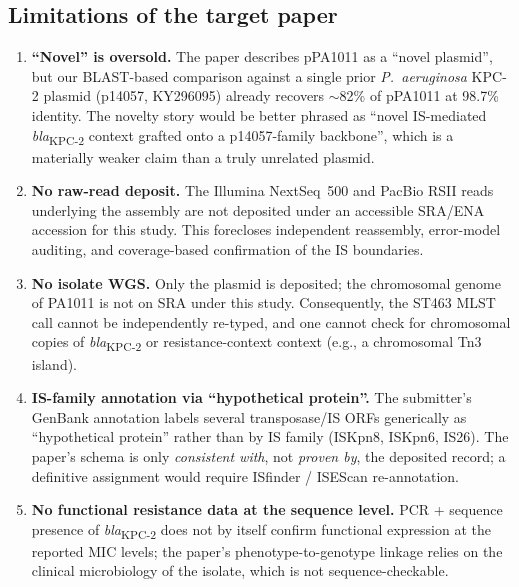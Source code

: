 \documentclass[11pt]{article}
\begin{document}
\subsection{Limitations of the target paper}
\begin{enumerate}[leftmargin=1.4em]
  \item \textbf{``Novel'' is oversold.} The paper describes pPA1011 as a ``novel plasmid'', but our BLAST-based comparison against a single prior \textit{P.~aeruginosa} KPC-2 plasmid (p14057, KY296095) already recovers $\sim$82\% of pPA1011 at 98.7\% identity. The novelty story would be better phrased as ``novel IS-mediated \textit{bla}\textsubscript{KPC-2} context grafted onto a p14057-family backbone'', which is a materially weaker claim than a truly unrelated plasmid.
  \item \textbf{No raw-read deposit.} The Illumina NextSeq~500 and PacBio RSII reads underlying the assembly are not deposited under an accessible SRA/ENA accession for this study. This forecloses independent reassembly, error-model auditing, and coverage-based confirmation of the IS boundaries.
  \item \textbf{No isolate WGS.} Only the plasmid is deposited; the chromosomal genome of PA1011 is not on SRA under this study. Consequently, the ST463 MLST call cannot be independently re-typed, and one cannot check for chromosomal copies of \textit{bla}\textsubscript{KPC-2} or resistance-context context (e.g., a chromosomal Tn3 island).
  \item \textbf{IS-family annotation via ``hypothetical protein''.} The submitter's GenBank annotation labels several transposase/IS ORFs generically as ``hypothetical protein'' rather than by IS family (ISKpn8, ISKpn6, IS26). The paper's schema is only \emph{consistent with}, not \emph{proven by}, the deposited record; a definitive assignment would require ISfinder / ISEScan re-annotation.
  \item \textbf{No functional resistance data at the sequence level.} PCR + sequence presence of \textit{bla}\textsubscript{KPC-2} does not by itself confirm functional expression at the reported MIC levels; the paper's phenotype-to-genotype linkage relies on the clinical microbiology of the isolate, which is not sequence-checkable.
\end{enumerate}
\end{document}
